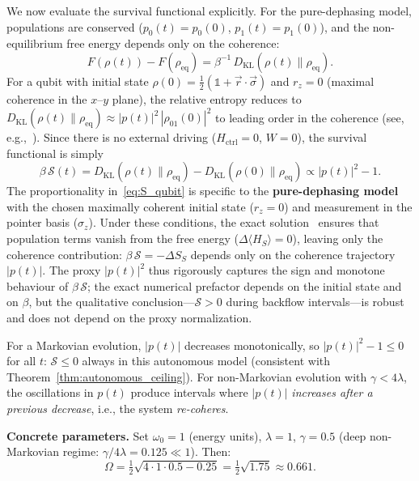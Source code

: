 \documentclass[12pt]{article}
\begin{document}
We now evaluate the survival functional explicitly.
For the pure-dephasing model, populations are conserved
($p_0(t) = p_0(0)$, $p_1(t) = p_1(0)$), and the non-equilibrium
free energy depends only on the coherence:
\begin{equation}
\label{eq:F_qubit}
F(\rho(t)) - F(\rho_{\mathrm{eq}})
= \beta^{-1}\, D_{\mathrm{KL}}(\rho(t) \| \rho_{\mathrm{eq}}).
\end{equation}
For a qubit with initial state
$\rho(0) = \tfrac{1}{2}(\mathbb{1} + \vec{r}\cdot\vec{\sigma})$
and $r_z = 0$ (maximal coherence in the $x$--$y$ plane),
the relative entropy reduces to
$D_{\mathrm{KL}}(\rho(t) \| \rho_{\mathrm{eq}})
\approx |p(t)|^2\, |\rho_{01}(0)|^2$
to leading order in the coherence (see,
e.g.,~\cite{BreuerPetruccione2002}).
Since there is no external driving ($H_{\mathrm{ctrl}} = 0$,
$W = 0$), the survival functional is simply
\begin{equation}
\label{eq:S_qubit}
\beta\,\mathcal{S}(t)
= D_{\mathrm{KL}}(\rho(t) \| \rho_{\mathrm{eq}})
  - D_{\mathrm{KL}}(\rho(0) \| \rho_{\mathrm{eq}})
\propto |p(t)|^2 - 1.
\end{equation}
The proportionality in~\eqref{eq:S_qubit} is specific to
the \textbf{pure-dephasing model} with the chosen maximally
coherent initial state ($r_z = 0$) and measurement in the
pointer basis ($\sigma_z$).
Under these conditions, the exact
solution~\cite{BreuerPetruccione2002} ensures that population
terms vanish from the free energy
($\Delta\langle H_S \rangle = 0$), leaving only the
coherence contribution:
$\beta\,\mathcal{S} = -\Delta S_S$ depends only on the
coherence trajectory $|p(t)|$.
The proxy $|p(t)|^2$ thus rigorously captures the sign and
monotone behaviour of $\beta\,\mathcal{S}$; the exact
numerical prefactor depends on the initial state and
on $\beta$, but the qualitative conclusion---$\mathcal{S} > 0$
during backflow intervals---is robust and does not depend on
the proxy normalization.

For a Markovian evolution, $|p(t)|$ decreases monotonically,
so $|p(t)|^2 - 1 \leq 0$ for all $t$: $\mathcal{S} \leq 0$
always in this autonomous model (consistent with
Theorem~\ref{thm:autonomous_ceiling}).
For non-Markovian evolution with $\gamma < 4\lambda$, the
oscillations in $p(t)$ produce intervals where $|p(t)|$
\emph{increases after a previous decrease}, i.e., the system
\emph{re-coheres}.

\textbf{Concrete parameters.}
Set $\omega_0 = 1$ (energy units), $\lambda = 1$,
$\gamma = 0.5$ (deep non-Markovian regime: $\gamma / 4\lambda = 0.125 \ll 1$).
Then:
\begin{equation}
\Omega = \tfrac{1}{2}\sqrt{4 \cdot 1 \cdot 0.5 - 0.25}
= \tfrac{1}{2}\sqrt{1.75} \approx 0.661.
\end{equation}
\end{document}

